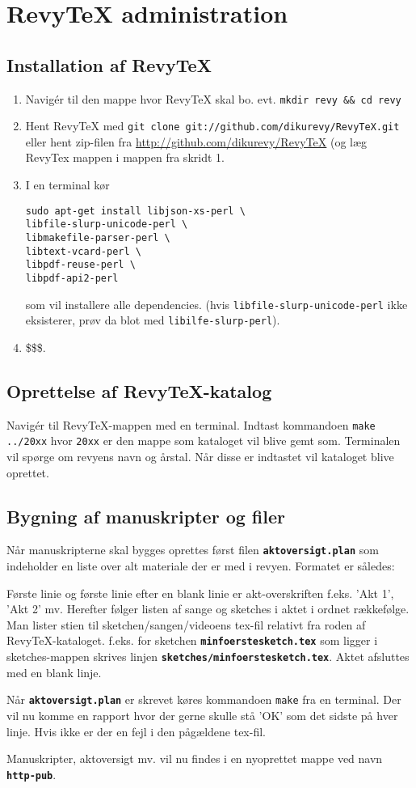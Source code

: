 \documentclass{article}
\newcommand{\fname}[1]{\textbf{\texttt{#1}}}
\newcommand{\shellcmd}[1]{\texttt{#1}}
\begin{document}
\section{RevyTeX administration}
\subsection{Installation af RevyTeX}
\begin{enumerate}
\item Navigér til den mappe hvor RevyTeX skal bo. evt. \shellcmd{mkdir
revy \&\& cd revy}
\item Hent RevyTeX med \shellcmd{git clone
git://github.com/dikurevy/RevyTeX.git} eller hent zip-filen fra
\url{http://github.com/dikurevy/RevyTeX} (og læg RevyTex mappen i mappen
fra skridt 1.
\item I en terminal kør 
\begin{verbatim}
sudo apt-get install libjson-xs-perl \
libfile-slurp-unicode-perl \
libmakefile-parser-perl \
libtext-vcard-perl \
libpdf-reuse-perl \
libpdf-api2-perl
\end{verbatim} som vil installere alle
dependencies. (hvis \shellcmd{libfile-slurp-unicode-perl} ikke
eksisterer, prøv da blot med \shellcmd{libilfe-slurp-perl}).
\item \$\$\$.
\end{enumerate}

\subsection{Oprettelse af RevyTeX-katalog}
Navigér til RevyTeX-mappen med en terminal. Indtast kommandoen \shellcmd{make
../20xx} hvor \texttt{20xx} er den mappe som kataloget vil blive gemt som.
Terminalen vil spørge om revyens navn og årstal. Når disse er indtastet
vil kataloget blive oprettet.

\subsection{Bygning af manuskripter og filer}
Når manuskripterne skal bygges oprettes først filen
\fname{aktoversigt.plan}
som indeholder en liste over alt materiale der er med i revyen. Formatet
er således:

Første linie og første linie efter en blank linie er akt-overskriften
f.eks. 'Akt 1', 'Akt 2' mv. Herefter følger listen af sange og sketches
i aktet i ordnet rækkefølge. Man lister stien til
sketchen/sangen/videoens tex-fil relativt fra roden af
RevyTeX-kataloget. f.eks. for sketchen \fname{minfoerstesketch.tex} som ligger
i sketches-mappen skrives linjen \fname{sketches/minfoerstesketch.tex}. Aktet
afsluttes med en blank linje.

Når \fname{aktoversigt.plan} er skrevet køres kommandoen \shellcmd{make} fra en terminal.
Der vil nu komme en rapport hvor der gerne skulle stå 'OK' som det
sidste på hver linje. Hvis ikke er der en fejl i den pågældene tex-fil.

Manuskripter, aktoversigt mv. vil nu findes i en nyoprettet mappe ved
navn \fname{http-pub}.
\end{document}
